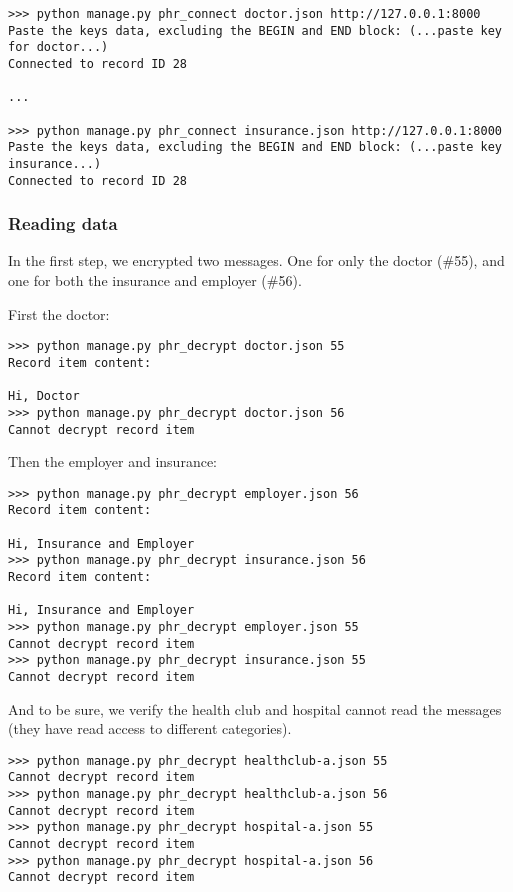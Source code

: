 \documentclass[a4paper]{article}
\begin{document}
			\begin{lstlisting}
>>> python manage.py phr_connect doctor.json http://127.0.0.1:8000
Paste the keys data, excluding the BEGIN and END block: (...paste key for doctor...)
Connected to record ID 28

...

>>> python manage.py phr_connect insurance.json http://127.0.0.1:8000
Paste the keys data, excluding the BEGIN and END block: (...paste key insurance...)
Connected to record ID 28
			\end{lstlisting}
			
		\subsubsection{Reading data}
			In the first step, we encrypted two messages. One for only the doctor (\#55), and one for both the insurance and employer (\#56). 
			
			First the doctor:
			
			\begin{lstlisting}
>>> python manage.py phr_decrypt doctor.json 55
Record item content:

Hi, Doctor
>>> python manage.py phr_decrypt doctor.json 56
Cannot decrypt record item
			\end{lstlisting}

			Then the employer and insurance:

			\begin{lstlisting}
>>> python manage.py phr_decrypt employer.json 56
Record item content:

Hi, Insurance and Employer
>>> python manage.py phr_decrypt insurance.json 56
Record item content:

Hi, Insurance and Employer
>>> python manage.py phr_decrypt employer.json 55
Cannot decrypt record item
>>> python manage.py phr_decrypt insurance.json 55
Cannot decrypt record item
			\end{lstlisting}
			
			And to be sure, we verify the health club and hospital cannot read the messages (they have read access to different categories).

			\begin{lstlisting}
>>> python manage.py phr_decrypt healthclub-a.json 55
Cannot decrypt record item
>>> python manage.py phr_decrypt healthclub-a.json 56
Cannot decrypt record item
>>> python manage.py phr_decrypt hospital-a.json 55
Cannot decrypt record item
>>> python manage.py phr_decrypt hospital-a.json 56
Cannot decrypt record item
			\end{lstlisting}
		
\end{document}

